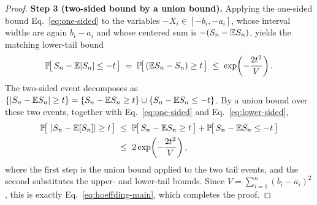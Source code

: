 \begin{proof}
\smallskip\noindent\textbf{Step 3 (two-sided bound by a union bound).}
Applying the one-sided bound Eq.~\eqref{eq:one-sided} to the variables $-X_i \in
[-b_i, -a_i]$, whose interval widths are again $b_i - a_i$ and whose centered sum
is $-(S_n - \mathbb{E} S_n)$, yields the matching lower-tail bound
\begin{align}
\mathbb{P}\!\big[\, S_n - \mathbb{E}[S_n] \le -t \,\big]
\;=\; \mathbb{P}\!\big[\, (\mathbb{E} S_n - S_n) \ge t \,\big]
\;\le\; \exp\!\left( - \frac{2 t^2}{V} \right). \label{eq:lower-sided}
\end{align}
The two-sided event decomposes as $\{\left| S_n - \mathbb{E} S_n \right| \ge t\} = \{S_n - \mathbb{E} S_n
\ge t\} \cup \{S_n - \mathbb{E} S_n \le -t\}$. By a union bound over these two events,
together with Eq.~\eqref{eq:one-sided} and Eq.~\eqref{eq:lower-sided},
\begin{align}
\mathbb{P}\!\big[\, \left| S_n - \mathbb{E}[S_n] \right| \ge t \,\big]
&\;\le\; \mathbb{P}\!\big[\, S_n - \mathbb{E} S_n \ge t \,\big] + \mathbb{P}\!\big[\, S_n - \mathbb{E} S_n \le -t \,\big] \notag \\
&\;\le\; 2 \exp\!\left( - \frac{2 t^2}{V} \right), \label{eq:two-sided}
\end{align}
where the first step is the union bound applied to the two tail events, and the
second substitutes the upper- and lower-tail bounds. Since $V = \sum_{i=1}^n
(b_i - a_i)^2$, this is exactly Eq.~\eqref{eq:hoeffding-main}, which completes
the proof.
\end{proof}
